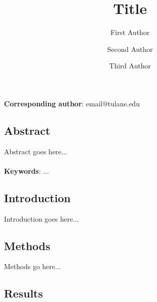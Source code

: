 \documentclass[12pt]{article}
\begin{document}
\setcounter{page}{1}

\title{Title}

\author[a]{First Author}
\author[b]{Second Author}
\author[b]{Third Author}


\maketitle

\noindent \textbf{Corresponding author}:  email@tulane.edu \\


\thispagestyle{empty}

\vspace{-1cm}



\clearpage





\thispagestyle{fancy}
\subsection*{Abstract}

Abstract goes here...


\paragraph*{}
\noindent \textbf{Keywords}: ...  \\ 







\clearpage

\subsection*{Introduction}

Introduction goes here...

\subsection*{Methods}

Methods go here...

\subsection*{Results}
\end{document}
